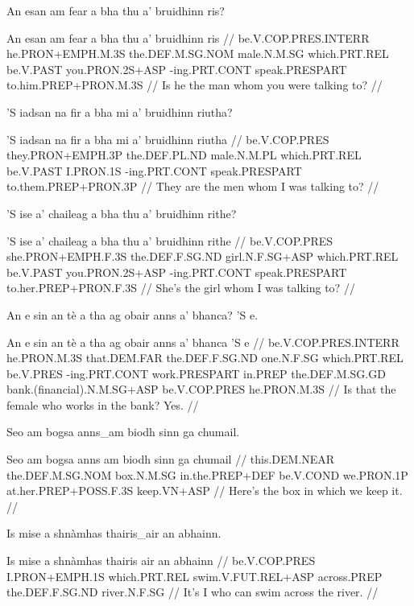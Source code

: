 \documentclass[a4paper,10pt]{article}
\begin{document}
\ex
\begingl
\glpre An esan am fear a bha thu a' bruidhinn ris? 

\vspace{4mm}
\gla An esan am fear a bha thu a' bruidhinn ris  //
\glb be.V.COP.PRES.INTERR he.PRON+EMPH.M.3S the.DEF.M.SG.NOM male.N.M.SG which.PRT.REL be.V.PAST you.PRON.2S+ASP -ing.PRT.CONT speak.PRESPART to.him.PREP+PRON.M.3S  //
\glft Is he the man whom you were talking to? //
\endgl
\xe

\ex
\begingl
\glpre 'S iadsan na fir a bha mi a' bruidhinn riutha? 

\vspace{4mm}
\gla 'S iadsan na fir a bha mi a' bruidhinn riutha  //
\glb be.V.COP.PRES they.PRON+EMPH.3P the.DEF.PL.ND male.N.M.PL which.PRT.REL be.V.PAST I.PRON.1S -ing.PRT.CONT speak.PRESPART to.them.PREP+PRON.3P  //
\glft They are the men whom I was talking to? //
\endgl
\xe

\ex
\begingl
\glpre 'S ise a' chaileag a bha thu a' bruidhinn rithe? 

\vspace{4mm}
\gla 'S ise a' chaileag a bha thu a' bruidhinn rithe  //
\glb be.V.COP.PRES she.PRON+EMPH.F.3S the.DEF.F.SG.ND girl.N.F.SG+ASP which.PRT.REL be.V.PAST you.PRON.2S+ASP -ing.PRT.CONT speak.PRESPART to.her.PREP+PRON.F.3S  //
\glft She's the girl whom I was talking to? //
\endgl
\xe

\ex
\begingl
\glpre An e sin an tè a tha ag obair anns a' bhanca? 'S e. 

\vspace{4mm}
\gla An e sin an tè a tha ag obair anns a' bhanca 'S e  //
\glb be.V.COP.PRES.INTERR he.PRON.M.3S that.DEM.FAR the.DEF.F.SG.ND one.N.F.SG which.PRT.REL be.V.PRES -ing.PRT.CONT work.PRESPART in.PREP the.DEF.M.SG.GD bank.(financial).N.M.SG+ASP be.V.COP.PRES he.PRON.M.3S  //
\glft Is that the female who works in the bank? Yes. //
\endgl
\xe

\ex
\begingl
\glpre Seo am bogsa anns\_am biodh sinn ga chumail. 

\vspace{4mm}
\gla Seo am bogsa {anns am} biodh sinn ga chumail  //
\glb this.DEM.NEAR the.DEF.M.SG.NOM box.N.M.SG in.the.PREP+DEF be.V.COND we.PRON.1P at.her.PREP+POSS.F.3S keep.VN+ASP  //
\glft Here's the box in which we keep it. //
\endgl
\xe

\ex
\begingl
\glpre Is mise a shnàmhas thairis\_air an abhainn. 

\vspace{4mm}
\gla Is mise a shnàmhas {thairis air} an abhainn  //
\glb be.V.COP.PRES I.PRON+EMPH.1S which.PRT.REL swim.V.FUT.REL+ASP across.PREP the.DEF.F.SG.ND river.N.F.SG  //
\glft It's I who can swim across the river. //
\endgl
\xe
\end{document}
